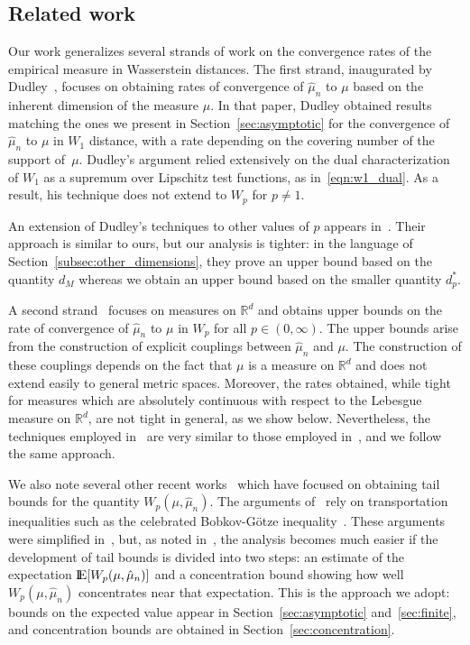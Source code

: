 \documentclass[sts]{imsart}
\newcommand{\RR}{\mathbb{R}}
\begin{document}
\subsection{Related work}
Our work generalizes several strands of work on the convergence rates of the empirical measure in Wasserstein distances.
The first strand, inaugurated by Dudley~\cite{Dud68}, focuses on obtaining rates of convergence of $\hat \mu_n$ to $\mu$ based on the inherent dimension of the measure $\mu$.
In that paper, Dudley obtained results matching the ones we present in Section~\ref{sec:asymptotic} for the convergence of $\hat \mu_n$ to $\mu$ in $W_1$ distance, with a rate depending on the covering number of the support of~$\mu$.
Dudley's argument relied extensively on the dual characterization of $W_1$ as a supremum over Lipschitz test functions, as in~\eqref{eqn:w1_dual}.
As a result, his technique does not extend to $W_p$ for $p \neq 1$.

An extension of Dudley's techniques to other values of $p$ appears in~\cite{BoiLeg14}.
Their approach is similar to ours, but our analysis is tighter: in the language of Section~\ref{subsec:other_dimensions}, they prove an upper bound based on the quantity $d_M$ whereas we obtain an upper bound based on the smaller quantity $d_p^*$.

A second strand~\cite{FouGui15,DerSchSch13} focuses on measures on $\RR^d$ and obtains upper bounds on the rate of convergence of $\hat \mu_n$ to $\mu$ in $W_p$ for all $p \in (0, \infty)$.
The upper bounds arise from the construction of explicit couplings between $\hat \mu_n$ and $\mu$.
The construction of these couplings depends on the fact that $\mu$ is a measure on $\RR^d$ and does not extend easily to general metric spaces.
Moreover, the rates obtained, while tight for measures which are absolutely continuous with respect to the Lebesgue measure on $\RR^d$, are not tight in general, as we show below.
Nevertheless, the techniques employed in~\cite{FouGui15,DerSchSch13} are very similar to those employed in~\cite{BoiLeg14}, and we follow the same approach.

We also note several other recent works~\cite{Boi11,BolGuiVil07} which have focused on obtaining tail bounds for the quantity $W_p(\mu, \hat \mu_n)$.
The arguments of~\cite{BolGuiVil07} rely on transportation inequalities such as the celebrated Bobkov-G\"{o}tze inequality~\cite{BobGoe99}.
These arguments were simplified in~\cite{Boi11}, but, as noted in~\cite{BoiLeg14}, the analysis becomes much easier if the development of tail bounds is divided into two steps: an estimate of the expectation ${\rm I}\kern-0.18em{\rm E}[W_p(\mu, \hat \mu_n)]$ and a concentration bound showing how well $W_p(\mu, \hat \mu_n)$ concentrates near that expectation.
This is the approach we adopt: bounds on the expected value appear in Section~\ref{sec:asymptotic} and~\ref{sec:finite}, and concentration bounds are obtained in Section~\ref{sec:concentration}.
\end{document}

